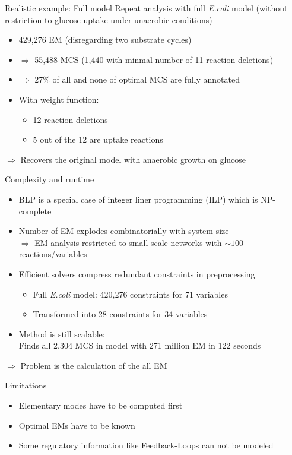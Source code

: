 \documentclass{beamer}
\begin{document}
\begin{frame}{Realistic example: Full model}
Repeat analysis with full \emph{E.coli} model (without restriction to glucose uptake under unaerobic conditions)
\begin{itemize}
	\item 429,276 EM (disregarding two substrate cycles) %
	\item $\Rightarrow$ 55,488 MCS (1,440 with minmal number of 11 reaction deletions)
	\item $\Rightarrow$ 27\% of all and none of optimal MCS are fully annotated
	\item With weight function:
	\begin{itemize}
		\item 12 reaction deletions
		\item 5 out of the 12 are uptake reactions
	\end{itemize}
\end{itemize}
$\Rightarrow$ Recovers the original model with anaerobic growth on glucose

\end{frame}

\begin{frame}{Complexity and runtime}
\begin{itemize}
	\item BLP is a special case of integer liner programming (ILP) which is NP-complete 
	\item Number of EM explodes combinatorially with system size \\
	 $\Rightarrow$ EM analysis restricted to 
	small scale networks with $\sim 100$ reactions/variables
	\item Efficient solvers compress redundant constraints in preprocessing
	\begin{itemize}
		\item Full \emph{E.coli} model: 420,276 constraints for 71 variables
		\item Transformed into 28 constraints for 34 variables
	\end{itemize}
	\item Method is still scalable: \\
	Finds all 2.304 MCS in model with 271 million EM in 122 seconds 
\end{itemize}
$\Rightarrow$ Problem is the calculation of the all EM
\end{frame}


\begin{frame}{Limitations}
	\begin{itemize}
		\item Elementary modes have to be computed first
		\item Optimal EMs have to be known
		\item Some regulatory information like Feedback-Loops can not be modeled
	\end{itemize}
\end{frame}
\end{document}
